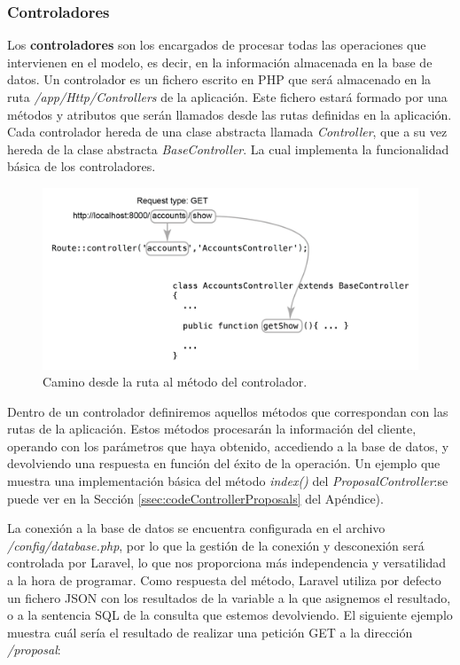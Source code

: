 \subsubsection{Controladores}

Los \textbf{controladores} son los encargados de procesar todas las operaciones que intervienen en el modelo, es decir, en la información almacenada en la base de datos. Un controlador es un fichero escrito en PHP que será almacenado en la ruta \textit{/app/Http/Controllers} de la aplicación. Este fichero estará formado por una métodos y atributos que serán llamados desde las rutas definidas en la aplicación. Cada controlador hereda de una clase abstracta llamada \textit{Controller}, que a su vez hereda de la clase abstracta \textit{BaseController}. La cual implementa la funcionalidad básica de los controladores.

\begin{figure}[H]
\centering
\includegraphics[keepaspectratio, scale=1]{Media/Captures/getDiagramMethod.png}
\caption{Camino desde la ruta al método del controlador.}
\label{fig:laravelArch}
\end{figure}

Dentro de un controlador definiremos aquellos métodos que correspondan con las rutas de la aplicación. Estos métodos procesarán la información del cliente, operando con los parámetros que haya obtenido, accediendo a la base de datos, y devolviendo una respuesta en función del éxito de la operación. Un ejemplo que muestra una implementación básica del método \textit{index()} del \textit{ProposalController}:se puede ver en la Sección \ref{ssec:codeControllerProposals} del Apéndice).

La conexión a la base de datos se encuentra configurada en el archivo \textit{/config/database.php}, por lo que la gestión de la conexión y desconexión será controlada por Laravel, lo que nos proporciona más independencia y versatilidad a la hora de programar. Como respuesta del método, Laravel utiliza por defecto un fichero JSON con los resultados de la variable a la que asignemos el resultado, o a la sentencia SQL de la consulta que estemos devolviendo. El siguiente ejemplo muestra cuál sería el resultado de realizar una petición GET a la dirección \textit{/proposal}:


